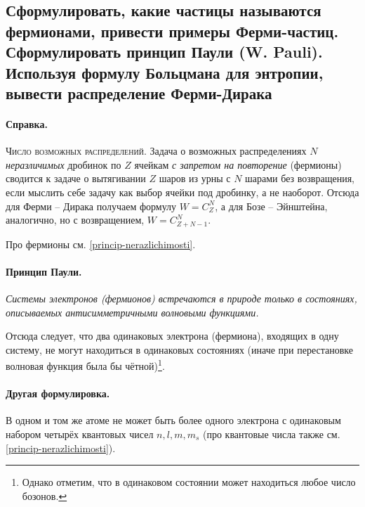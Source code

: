 \subsection{Сформулировать, какие частицы называются фермионами, привести примеры Ферми-частиц.
Сформулировать принцип Паули (W. Pauli). Используя формулу Больцмана для энтропии, вывести
распределение Ферми-Дирака} \label{fermi-dirak}
{\footnotesize \paragraph{\footnotesize Справка.} \textsc{Число возможных распределений.}
  Задача о возможных распределениях $ N $ \textsl{неразличимых} дробинок по $ Z $ ячейкам
  \textsl{с запретом на повторение} (фермионы) 
  сводится к задаче о вытягивании $ Z $ шаров из урны с $ N $ шарами без
  возвращения, если
  мыслить себе задачу как выбор ячейки под дробинку, а не наоборот. Отсюда для
  Ферми -- Дирака получаем формулу $ W = C_Z^N $, а для Бозе -- Эйнштейна,
  аналогично, но с возвращением, $ W = C_{Z+N-1}^N $.

  Про фермионы см. \ref{princip-nerazlichimosti}.
}

\paragraph{Принцип Паули.}
\textit{Системы электронов (фермионов) встречаются в природе только в состояниях, описываемых антисимметричными волновыми функциями. }

Отсюда следует, что два одинаковых электрона (фермиона), входящих в одну систему, не могут находиться в одинаковых состояниях (иначе при перестановке волновая функция была бы чётной)\footnote{Однако отметим, что в одинаковом состоянии может находиться любое число бозонов.}.

\paragraph{Другая формулировка.} В одном и том же атоме не может быть более одного электрона с одинаковым набором четырёх квантовых чисел $n, l , m, m_s$ (про квантовые числа также см. \ref{princip-nerazlichimosti}).

